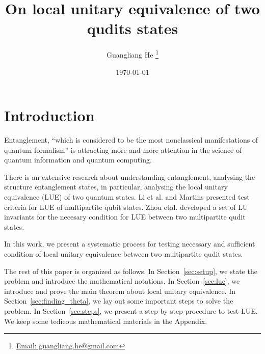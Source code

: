\documentclass{article}
\title{On local unitary equivalence of two qudits states}
\author{Guangliang He
  \thanks{\href{mailto:guangliang.he@gmail.com}
    {Email: guangliang.he@gmail.com}}}
\date{\today}
\begin{document}
\maketitle

\section{Introduction}
Entanglement, ``which is considered to be the most nonclassical
manifestations of quantum formalism''\cite{Horodecki_2009}
is attracting more and more attention in the science of quantum
information and quantum computing.

There is an extensive research about understanding entanglement,
analysing the structure entanglement states, in particular,
analysing the local unitary equivalence (LUE) of two quantum states.
Li et al.\cite{Li_2014} and Martins\cite{Martins_2015} presented
test criteria for LUE of multipartite qubit states.
Zhou etal.\cite{Zhou_2024} developed a set of LU invariants for
the necesary condition for LUE between two multipartite qudit states.

In this work, we present a systematic process for testing
necessary and sufficient condition of local unitary equivalence
between two multipartite qudit states.

The rest of this paper is organized as follows. In
Section~\ref{sec:setup}, we state the problem and introduce the
mathematical notations.  In Section~\ref{sec:lue}, we introduce
and prove the main theorem about local unitary equivalence.
In Section~\ref{sec:finding_theta}, we lay out some important
steps to solve the problem.  In Section~\ref{sec:steps}, we
present a step-by-step procedure to test LUE.  We keep some
tedieous mathematical materials in the Appendix.
\end{document}
